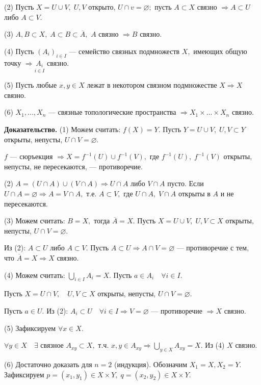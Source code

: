 \documentclass[12pt,a4paper]{article}
\begin{document}
(2) Пусть $X = U \cup V, \; U, V$ открыто, $U \cap v = \varnothing;$ пусть $A \subset X$ связно $\Rightarrow A \subset U$ либо $A \subset V.$ 

(3) $A, B \subset X, \; A \subset B \subset \overline{A},$ $A$ связно $\Rightarrow B$ связно.

(4) Пусть $(A_{i})_{i \in I}$ --- семейство связных подмножеств $X,$ имеющих общую точку $\Rightarrow \underset{i \in I}{A_{i}}$ связно.

(5) Пусть любые $x, y \in X$ лежат в некотором связном подмножестве $X \Rightarrow X$ связно. 

(6) $X_{1}, ..., X_{n}$ --- связные топологические пространства $\Rightarrow X_{1} \times ... \times X_{n}$ связно.

\textbf{Доказательство.} (1) Можем считать: $f(X) = Y.$ Пусть $Y = U \cup V, \; U, V \subset Y$ открыты, непусты, $U \cap V = \varnothing.$ 

$f$ --- сюръекция $\Rightarrow X = f^{-1}(U) \cup f^{-1}(V),$ где $f^{-1}(U), \;  f^{-1}(V)$ открыты, непусты, не пересекаются, --- противоречие. 

(2) $A = (U \cap A) \cup (V \cap A) \Rightarrow U \cap A$ либо $V \cap A$ пусто. Если $U \cap A = \varnothing \Rightarrow A = V \cap A,$ т.е. $A \subset V,$ где $U \cap A, \; V \cap A$ открыты в $A$ и не пересекаются. 

(3) Можем считать: $B = X,$ тогда $\overline{A} = X.$ Пусть $X = U \cup V, \; U, V \subset X$ открыты, непусты, $U \cap V = \varnothing.$

Из (2): $A \subset U$ либо $A \subset V.$ Пусть $A \subset U \Rightarrow A \cap V = \varnothing$ --- противоречие с тем, что $\overline{A} = X \Rightarrow X$ связно.

(4) Можем считать: $\underset{i \in I}{\bigcup} A_{i} = X.$ Пусть $a \in A_{i} \quad \forall i \in I.$ 

Пусть $X = U \cap V, \quad U, V \subset X$ открыты, непусты, $U \cap V = \varnothing.$ 

Пусть $a \in U.$ Из (2): $A_{i} \subset U \quad \forall i \in I \Rightarrow V = \varnothing$ --- противоречие $\Rightarrow X$ связно.

(5) Зафиксируем $\forall x \in X.$ 

$\forall y \in X \quad \exists$ связное $A_{xy} \subset X,$ т.ч. $x, y \in A_{xy} \Rightarrow \underset{y \in X}{\bigcup} A_{xy} = X.$ Из (4) $X$ связно.

(6) Достаточно доказать для $n = 2$ (индукция). Обозначим $X_{1} = X, X_{2} = Y.$ Зафиксируем $p = (x_{1}, y_{1}) \in X \times Y, \; q = (x_{2}, y_{2}) \in X \times Y.$ 
\end{document}
